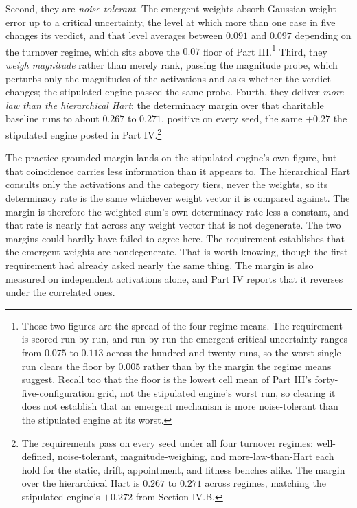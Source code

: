 Second, they are \textit{noise-tolerant}. The emergent weights absorb Gaussian
weight error up to a critical uncertainty, the level at which more than one
case in five changes its verdict, and that level averages between $0.091$ and
$0.097$ depending on the turnover regime, which sits above the $0.07$ floor of
Part III.\footnote{Those two figures are the spread of the four regime means. The
requirement is scored run by run, and run by run the emergent critical
uncertainty ranges from $0.075$ to $0.113$ across the hundred and twenty runs,
so the worst single run clears the floor by $0.005$ rather than by the margin
the regime means suggest. Recall too that the floor is the lowest cell mean of
Part III's forty-five-configuration grid, not the stipulated engine's worst
run, so clearing it does not establish that an emergent mechanism is more
noise-tolerant than the stipulated engine at its worst.} Third, they
\textit{weigh magnitude} rather than merely rank, passing the magnitude probe,
which perturbs only the magnitudes of the activations and asks whether the
verdict changes; the stipulated engine passed the same probe. Fourth, they deliver
\textit{more law than the hierarchical Hart}: the determinacy margin over
that charitable baseline runs to about $0.267$ to $0.271$, positive on
every seed, the same $+0.27$ the stipulated engine posted in
Part IV.\footnote{The requirements pass on every seed under all four
turnover regimes: well-defined, noise-tolerant, magnitude-weighing, and
more-law-than-Hart each hold for the static, drift, appointment, and fitness
benches alike. The margin over the hierarchical Hart is
$0.267$ to $0.271$ across regimes, matching the stipulated engine's
$+0.272$ from Section IV.B.}

The practice-grounded margin lands on the stipulated engine's own figure, but
that coincidence carries less information than it appears to. The hierarchical
Hart consults only the activations and the category tiers, never the weights,
so its determinacy rate is the same whichever weight vector it is compared
against. The margin is therefore the weighted sum's own determinacy rate less
a constant, and that rate is nearly flat across any weight vector that is not
degenerate. The two margins could hardly have failed to agree here. The
requirement establishes that the emergent weights are nondegenerate. That is
worth knowing, though the first requirement had already asked nearly the same
thing. The
margin is also measured on independent activations alone, and Part IV reports
that it reverses under the correlated ones.

